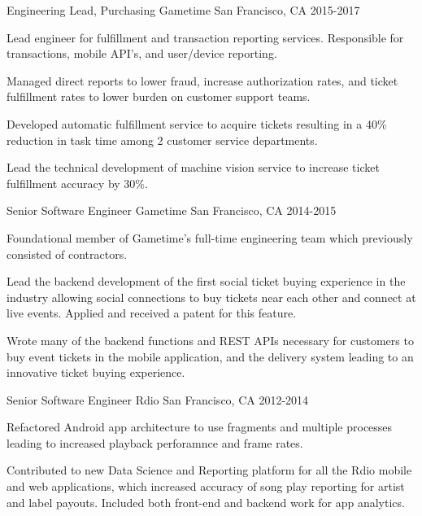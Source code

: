 \begin{cventries}
  \cventry
    {Engineering Lead, Purchasing} %
    {Gametime} %
    {San Francisco, CA} %
    {2015-2017} %
    {
      \begin{cvitems} %
        \item {Lead engineer for fulfillment and transaction reporting services. Responsible for transactions, mobile API's, and user/device reporting.}
        \item {Managed direct reports to lower fraud, increase authorization rates, and ticket fulfillment rates to lower burden on customer support teams.}
        \item {Developed automatic fulfillment service to acquire tickets resulting in a 40\% reduction in task time among 2 customer service departments.}
        \item {Lead the technical development of machine vision service to increase ticket fulfillment accuracy by 30\%.}
      \end{cvitems}
    }

  \cventry
    {Senior Software Engineer} %
    {Gametime} %
    {San Francisco, CA} %
    {2014-2015} %
    {
      \begin{cvitems} %
        \item {Foundational member of Gametime's full-time engineering team which previously consisted of contractors.}
        \item {Lead the backend development of the first social ticket buying experience in the industry allowing social connections to buy tickets near each other and connect at live events. Applied and received a patent for this feature.}
        \item {Wrote many of the backend functions and REST APIs necessary for customers to buy event tickets in the mobile application, and the delivery system leading to an innovative ticket buying experience.}
      \end{cvitems}
    }

  \cventry
    {Senior Software Engineer} %
    {Rdio} %
    {San Francisco, CA} %
    {2012-2014} %
    {
      \begin{cvitems} %
        \item {Refactored Android app architecture to use fragments and multiple processes leading to increased playback perforamnce and frame rates.}
        \item {Contributed to new Data Science and Reporting platform for all the Rdio mobile and web applications, which increased accuracy of song play reporting for artist and label payouts. Included both front-end and backend work for app analytics.}
      \end{cvitems}
    }

\end{cventries}
